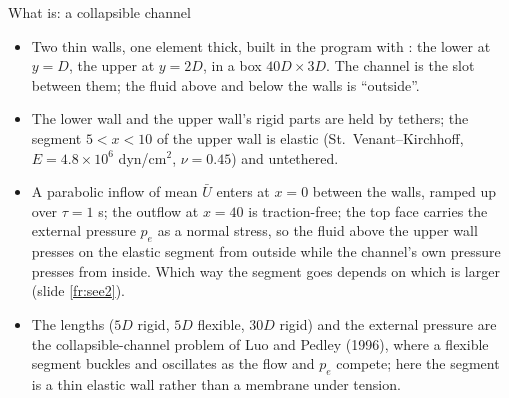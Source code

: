 \documentclass[aspectratio=169,11pt]{beamer}
\begin{document}
\begin{frame}{What  is: a collapsible channel}
\label{fr:ex7}
\footnotesize
\begin{center}
\end{center}
\begin{itemize}
  \item Two thin walls, one element thick, built in the program with : the lower at $y = D$, the upper at $y = 2D$, in a box $40D\times3D$. The channel is the slot between them; the fluid above and below the walls is ``outside''.
  \item The lower wall and the upper wall's rigid parts are held by tethers; the segment $5 < x < 10$ of the upper wall is elastic (St.\ Venant--Kirchhoff, $E = 4.8\times10^6$ dyn/cm$^2$, $\nu = 0.45$) and untethered.
  \item A parabolic inflow of mean $\bar U$ enters at $x = 0$ between the walls, ramped up over $\tau = 1$ s; the outflow at $x = 40$ is traction-free; the top face carries the external pressure $p_e$ as a normal stress, so the fluid above the upper wall presses on the elastic segment from outside while the channel's own pressure presses from inside. Which way the segment goes depends on which is larger (slide \ref{fr:see2}).
  \item The lengths ($5D$ rigid, $5D$ flexible, $30D$ rigid) and the external pressure are the collapsible-channel problem of Luo and Pedley (1996), where a flexible segment buckles and oscillates as the flow and $p_e$ compete; here the segment is a thin elastic wall rather than a membrane under tension.
\end{itemize}
\end{frame}
\end{document}
